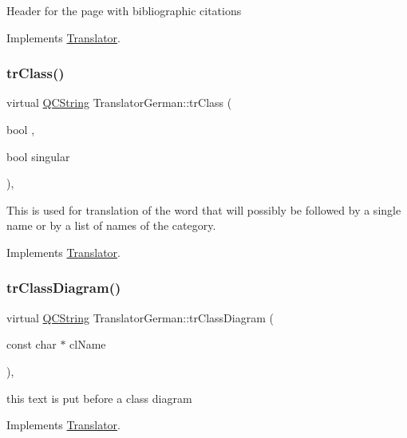 Header for the page with bibliographic citations 

Implements \mbox{\hyperlink{class_translator}{Translator}}.

\mbox{\label{class_translator_german_ab518854eb67b22b895074c0f845bfe42}} 
\subsubsection{\texorpdfstring{trClass()}{trClass()}}
{\footnotesize\ttfamily virtual \mbox{\hyperlink{class_q_c_string}{Q\+C\+String}} Translator\+German\+::tr\+Class (\begin{DoxyParamCaption}\item[{bool}]{,  }\item[{bool}]{singular }\end{DoxyParamCaption})\hspace{0.3cm}{\ttfamily [inline]}, {\ttfamily [virtual]}}

This is used for translation of the word that will possibly be followed by a single name or by a list of names of the category. 

Implements \mbox{\hyperlink{class_translator}{Translator}}.

\mbox{\label{class_translator_german_a26fafcfbab3da8f37dbbf89288ac9d94}} 
\subsubsection{\texorpdfstring{trClassDiagram()}{trClassDiagram()}}
{\footnotesize\ttfamily virtual \mbox{\hyperlink{class_q_c_string}{Q\+C\+String}} Translator\+German\+::tr\+Class\+Diagram (\begin{DoxyParamCaption}\item[{const char $\ast$}]{cl\+Name }\end{DoxyParamCaption})\hspace{0.3cm}{\ttfamily [inline]}, {\ttfamily [virtual]}}

this text is put before a class diagram 

Implements \mbox{\hyperlink{class_translator}{Translator}}.

